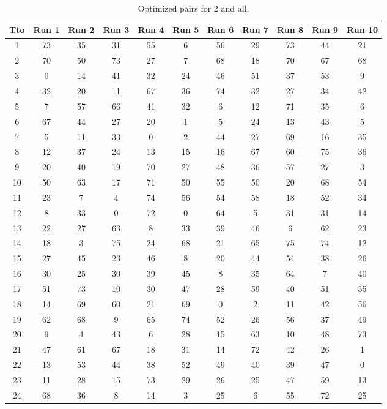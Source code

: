 \begin{table}
  \centering
  \scriptsize
  \caption{Optimized pairs for 2 and all.}
  \label{tab_pairs}
\begin{tabular}{c c c c c c c c c c c }
\hline
Tto & Run 1 & Run 2 & Run 3 & Run 4 & Run 5 & Run 6 & Run 7 & Run 8 & Run 9 & Run 10 \\
\hline
1 & 73 & 35 & 31 & 55 & 6 & 56 & 29 & 73 & 44 & 21 \\
2 & 70 & 50 & 73 & 27 & 7 & 68 & 18 & 70 & 67 & 68 \\
3 & 0 & 14 & 41 & 32 & 24 & 46 & 51 & 37 & 53 & 9 \\
4 & 32 & 20 & 11 & 67 & 36 & 74 & 32 & 27 & 34 & 42 \\
5 & 7 & 57 & 66 & 41 & 32 & 6 & 12 & 71 & 35 & 6 \\
6 & 67 & 44 & 27 & 20 & 1 & 5 & 24 & 13 & 43 & 5 \\
7 & 5 & 11 & 33 & 0 & 2 & 44 & 27 & 69 & 16 & 35 \\
8 & 12 & 37 & 24 & 13 & 15 & 16 & 67 & 60 & 75 & 36 \\
9 & 20 & 40 & 19 & 70 & 27 & 48 & 36 & 57 & 27 & 3 \\
10 & 50 & 63 & 17 & 71 & 50 & 55 & 50 & 20 & 68 & 54 \\
11 & 23 & 7 & 4 & 74 & 56 & 54 & 58 & 18 & 52 & 34 \\
12 & 8 & 33 & 0 & 72 & 0 & 64 & 5 & 31 & 31 & 14 \\
13 & 22 & 27 & 63 & 8 & 33 & 39 & 46 & 6 & 62 & 23 \\
14 & 18 & 3 & 75 & 24 & 68 & 21 & 65 & 75 & 74 & 12 \\
15 & 27 & 45 & 23 & 46 & 8 & 20 & 44 & 54 & 38 & 26 \\
16 & 30 & 25 & 30 & 39 & 45 & 8 & 35 & 64 & 7 & 40 \\
17 & 51 & 73 & 10 & 30 & 47 & 28 & 59 & 40 & 51 & 55 \\
18 & 14 & 69 & 60 & 21 & 69 & 0 & 2 & 11 & 42 & 56 \\
19 & 62 & 68 & 9 & 65 & 74 & 52 & 26 & 56 & 37 & 49 \\
20 & 9 & 4 & 43 & 6 & 28 & 15 & 63 & 10 & 48 & 73 \\
21 & 47 & 61 & 67 & 18 & 31 & 14 & 72 & 42 & 26 & 1 \\
22 & 13 & 53 & 44 & 38 & 52 & 49 & 40 & 39 & 47 & 0 \\
23 & 11 & 28 & 15 & 73 & 29 & 26 & 25 & 47 & 59 & 13 \\
24 & 68 & 36 & 8 & 14 & 3 & 25 & 6 & 55 & 72 & 25 \\

\end{tabular}
\end{table}
